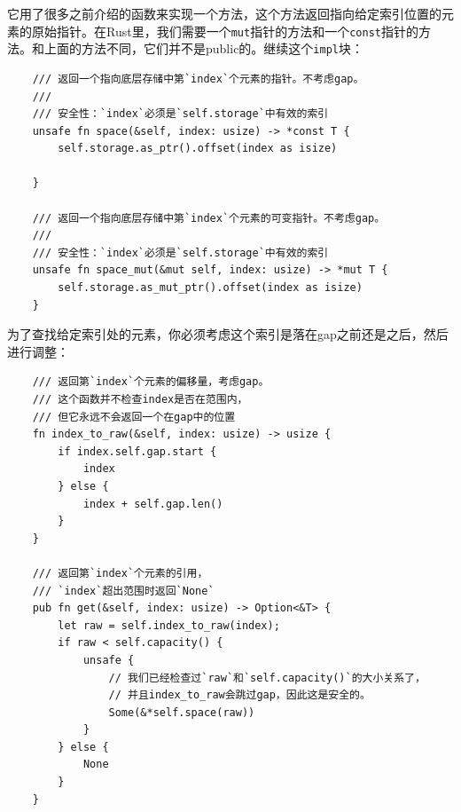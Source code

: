 它用了很多之前介绍的函数来实现一个方法，这个方法返回指向给定索引位置的元素的原始指针。在Rust里，我们需要一个\texttt{mut}指针的方法和一个\texttt{const}指针的方法。和上面的方法不同，它们并不是public的。继续这个\texttt{impl}块：
\begin{verbatim}
    /// 返回一个指向底层存储中第`index`个元素的指针。不考虑gap。
    ///
    /// 安全性：`index`必须是`self.storage`中有效的索引
    unsafe fn space(&self, index: usize) -> *const T {
        self.storage.as_ptr().offset(index as isize)
    
    }

    /// 返回一个指向底层存储中第`index`个元素的可变指针。不考虑gap。
    ///
    /// 安全性：`index`必须是`self.storage`中有效的索引
    unsafe fn space_mut(&mut self, index: usize) -> *mut T {
        self.storage.as_mut_ptr().offset(index as isize)
    }
\end{verbatim}

为了查找给定索引处的元素，你必须考虑这个索引是落在gap之前还是之后，然后进行调整：
\begin{verbatim}
    /// 返回第`index`个元素的偏移量，考虑gap。
    /// 这个函数并不检查index是否在范围内，
    /// 但它永远不会返回一个在gap中的位置
    fn index_to_raw(&self, index: usize) -> usize {
        if index.self.gap.start {
            index
        } else {
            index + self.gap.len()
        }
    }

    /// 返回第`index`个元素的引用，
    /// `index`超出范围时返回`None`
    pub fn get(&self, index: usize) -> Option<&T> {
        let raw = self.index_to_raw(index);
        if raw < self.capacity() {
            unsafe {
                // 我们已经检查过`raw`和`self.capacity()`的大小关系了，
                // 并且index_to_raw会跳过gap，因此这是安全的。
                Some(&*self.space(raw))
            }
        } else {
            None
        }
    }
\end{verbatim}

